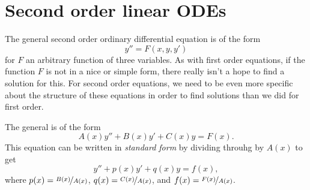 
\section{Second order linear ODEs} \label{solinear:section}




The general second order ordinary differential equation is of the form 
\begin{equation*}
y'' = F(x, y, y')
\end{equation*} for $F$ an arbitrary function of three variables. As with first order equations, if the function $F$ is not in a nice or simple form, there really isn't a hope to find a solution for this. For second order equations, we need to be even more specific about the structure of these equations in order to find solutions than we did for first order.


\begin{definition}
The general
\emph{} is of the form
\begin{equation*}
A(x) y'' + B(x)y' + C(x)y = F(x) .
\end{equation*}
This equation can be written in \emph{standard form} by dividing throuhg by $A(x)$ to get
\begin{equation} \label{sol:eqlin}
y'' + p(x)y' + q(x)y = f(x) ,
\end{equation}
where $p(x) = \nicefrac{B(x)}{A(x)}$, $q(x) = \nicefrac{C(x)}{A(x)}$, and
$f(x) = \nicefrac{F(x)}{A(x)}$.
\end{definition}

